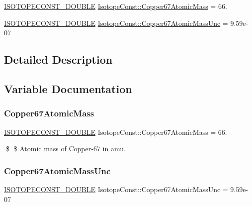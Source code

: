 \begin{DoxyCompactItemize}
\item 
\mbox{\hyperlink{group___isotope_const-_macros_ga8f45a7272ce02c0b4c65c44636ed719a}{I\+S\+O\+T\+O\+P\+E\+C\+O\+N\+S\+T\+\_\+\+D\+O\+U\+B\+LE}} \mbox{\hyperlink{group___isotope_const-_copper-_cu67_ga191306afe3fd1cd7776bef3e0cb77205}{Isotope\+Const\+::\+Copper67\+Atomic\+Mass}} = 66.
\item 
\mbox{\hyperlink{group___isotope_const-_macros_ga8f45a7272ce02c0b4c65c44636ed719a}{I\+S\+O\+T\+O\+P\+E\+C\+O\+N\+S\+T\+\_\+\+D\+O\+U\+B\+LE}} \mbox{\hyperlink{group___isotope_const-_copper-_cu67_ga787186d0b4731c1f2ca68f664f017858}{Isotope\+Const\+::\+Copper67\+Atomic\+Mass\+Unc}} = 9.\+59e-\/07
\end{DoxyCompactItemize}


\subsection{Detailed Description}


\subsection{Variable Documentation}
\mbox{\label{group___isotope_const-_copper-_cu67_ga191306afe3fd1cd7776bef3e0cb77205}} 
\subsubsection{\texorpdfstring{Copper67\+Atomic\+Mass}{Copper67AtomicMass}}
{\footnotesize\ttfamily \mbox{\hyperlink{group___isotope_const-_macros_ga8f45a7272ce02c0b4c65c44636ed719a}{I\+S\+O\+T\+O\+P\+E\+C\+O\+N\+S\+T\+\_\+\+D\+O\+U\+B\+LE}} Isotope\+Const\+::\+Copper67\+Atomic\+Mass = 66.}

\$ \$ Atomic mass of Copper-\/67 in amu. \mbox{\label{group___isotope_const-_copper-_cu67_ga787186d0b4731c1f2ca68f664f017858}} 
\subsubsection{\texorpdfstring{Copper67\+Atomic\+Mass\+Unc}{Copper67AtomicMassUnc}}
{\footnotesize\ttfamily \mbox{\hyperlink{group___isotope_const-_macros_ga8f45a7272ce02c0b4c65c44636ed719a}{I\+S\+O\+T\+O\+P\+E\+C\+O\+N\+S\+T\+\_\+\+D\+O\+U\+B\+LE}} Isotope\+Const\+::\+Copper67\+Atomic\+Mass\+Unc = 9.\+59e-\/07}


